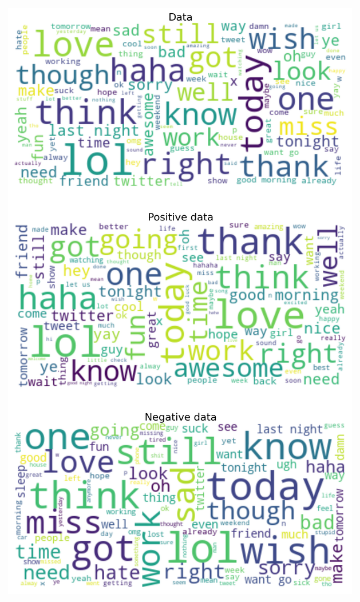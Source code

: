 \documentclass{article}
\begin{document}
\begin{itemize}
\begin{figure}[H]
\begin{subfigure}[b]{0.24\textwidth}
\includegraphics[width=\textwidth]{chapter-06/section-01-01/03/visualization/3/wordcloud.png}
\end{subfigure}
\begin{subfigure}[b]{0.24\textwidth}
\centering

\end{subfigure}
\end{figure}
\end{itemize}
\end{document}
